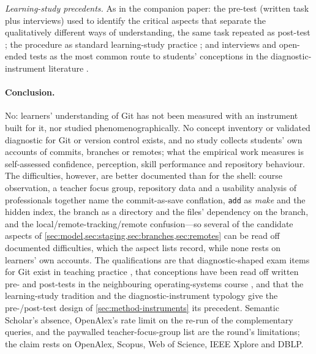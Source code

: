 \emph{Learning-study precedents.}
As in the companion paper: the pre-test (written task plus interviews)
used to identify the critical aspects that separate the qualitatively
different ways of understanding, the same task repeated as post-test
\autocite{PangMarton2005}; the procedure as standard learning-study
practice \autocite{Kullberg2017ZDM}; and interviews and open-ended tests
as the most common route to students' conceptions in the
diagnostic-instrument literature
\autocite{KaltakciGurel2015Diagnostics}.

\paragraph{Conclusion.}
No: learners' understanding of Git has not been measured with an
instrument built for it, nor studied phenomenographically.
No concept inventory or validated diagnostic for Git or version control
exists, and no study collects students' own accounts of commits,
branches or remotes; what the empirical work measures is self-assessed
confidence, perception, skill performance and repository behaviour.
The difficulties, however, are better documented than for the shell:
course observation, a teacher focus group, repository data and a
usability analysis of professionals together name the commit-as-save
conflation, \texttt{add} as \emph{make} and the hidden index, the branch
as a directory and the files' dependency on the branch, and the
local/remote-tracking/remote confusion---so several of the candidate
aspects of \cref{sec:model,sec:staging,sec:branches,sec:remotes} can be
read off documented difficulties, which the aspect lists record, while
none rests on learners' own accounts.
The qualifications are that diagnostic-shaped exam items for Git exist
in teaching practice \autocite{Beckman2021GitLearningObjective}, that
conceptions have been read off written pre- and post-tests in the
neighbouring operating-systems course \autocite{Pamplona2024VirtualMemory},
and that the learning-study tradition
\autocite{PangMarton2005,Kullberg2017ZDM} and the diagnostic-instrument
typology \autocite{KaltakciGurel2015Diagnostics} give the pre-/post-test
design of \cref{sec:method-instruments} its precedent.
Semantic Scholar's absence, OpenAlex's rate limit on the re-run of the
complementary queries, and the paywalled teacher-focus-group list are the
round's limitations; the claim rests on OpenAlex, Scopus, Web of
Science, IEEE Xplore and DBLP.
